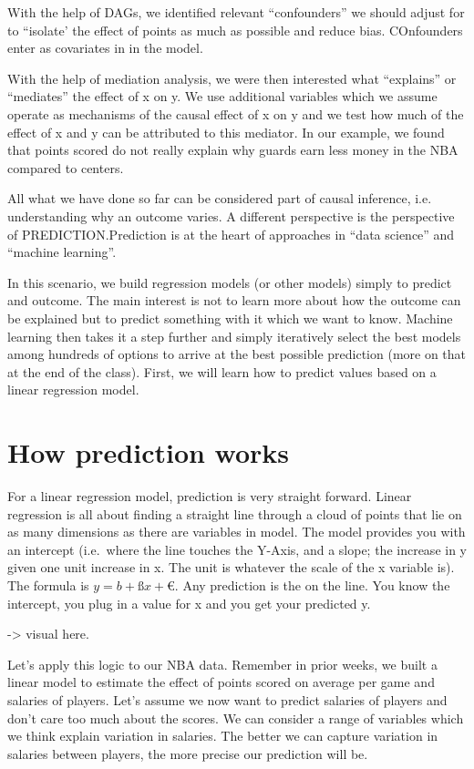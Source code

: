 \documentclass[
]{book}
\begin{document}
With the help of DAGs, we identified relevant ``confounders'' we should adjust for to ``isolate' the effect of points as much as possible and reduce bias. COnfounders enter as covariates in in the model.

With the help of mediation analysis, we were then interested what ``explains'' or ``mediates'' the effect of x on y. We use additional variables which we assume operate as mechanisms of the causal effect of x on y and we test how much of the effect of x and y can be attributed to this mediator. In our example, we found that points scored do not really explain why guards earn less money in the NBA compared to centers.

All what we have done so far can be considered part of causal inference, i.e.
understanding why an outcome varies. A different perspective is the perspective of PREDICTION.Prediction is at the heart of approaches in ``data science'' and ``machine learning''.

In this scenario, we build regression models (or other models) simply to predict and outcome. The main interest is not to learn more about how the outcome can be explained but to predict something with it which we want to know. Machine learning then takes it a step further and simply iteratively select the best models among hundreds of options to arrive at the best possible prediction (more on that at the end of the class). First, we will learn how to predict values based on a linear regression model.

\hypertarget{how-prediction-works}{%
\section{How prediction works}\label{how-prediction-works}}

For a linear regression model, prediction is very straight forward. Linear regression is all about finding a straight line through a cloud of points that lie on as many dimensions as there are variables in model. The model provides you with an intercept (i.e.~where the line touches the Y-Axis, and a slope; the increase in y given one unit increase in x. The unit is whatever the scale of the x variable is). The formula is \(y= b + ßx + €\). Any prediction is the on the line. You know the intercept, you plug in a value for x and you get your predicted y.

-\textgreater{} visual here.

Let's apply this logic to our NBA data. Remember in prior weeks, we built a linear model to estimate the effect of points scored on average per game and salaries of players. Let's assume we now want to predict salaries of players and don't care too much about the scores. We can consider a range of variables which we think explain variation in salaries. The better we can capture variation in salaries between players, the more precise our prediction will be.
\end{document}
